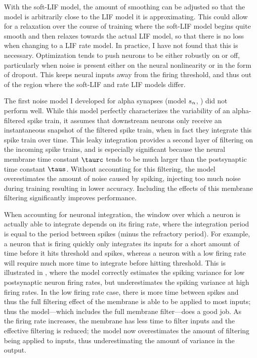 With the soft-LIF model, the amount of smoothing can be adjusted so that
the model is arbitrarily close to the LIF model it is approximating.
This could allow for a relaxation over the course of training
where the soft-LIF model begins quite smooth
and then relaxes towards the actual LIF model,
so that there is no loss when changing to a LIF rate model.
In practice, I have not found that this is necessary.
Optimization tends to push neurons to be either robustly on or off,
particularly when noise is present either on the neural nonlinearity
or in the form of dropout.
This keeps neural inputs away from the firing threshold,
and thus out of the region where the soft-LIF and rate LIF models differ.

The first noise model I developed for alpha synapses (model $s_\alpha$, )
did not perform well.
While this model perfectly characterizes
the variability of an alpha-filtered spike train,
it assumes that downstream neurons only receive an instantaneous snapshot
of the filtered spike train,
when in fact they integrate this spike train over time.
This leaky integration provides a second layer of filtering
on the incoming spike trains,
and is especially significant because the neural membrane time constant $\taurc$
tends to be much larger than the postsynaptic time constant $\taus$.
Without accounting for this filtering,
the model overestimates the amount of noise caused by spiking,
injecting too much noise during training resulting in lower accuracy.
Including the effects of this membrane filtering significantly improves performance.

When accounting for neuronal integration,
the window over which a neuron is actually able to integrate
depends on its firing rate,
where the integration period is equal to the period between spikes
(minus the refractory period).
For example, a neuron that is firing quickly only integrates its inputs
for a short amount of time before it hits threshold and spikes,
whereas a neuron with a low firing rate
will require much more time to integrate before hitting threshold.
This is illustrated in ,
where the model correctly estimates the spiking variance for low
postsynaptic neuron firing rates,
but underestimates the spiking variance at high firing rates.
In the low firing rate case,
there is more time between spikes and thus
the full filtering effect of the membrane is able to be applied to most inputs;
thus the model---which includes the full membrane filter---does a good job.
As the firing rate increases,
the membrane has less time to filter inputs
and the effective filtering is reduced;
the model now overestimates the amount of filtering being applied to inputs,
thus underestimating the amount of variance in the output.

